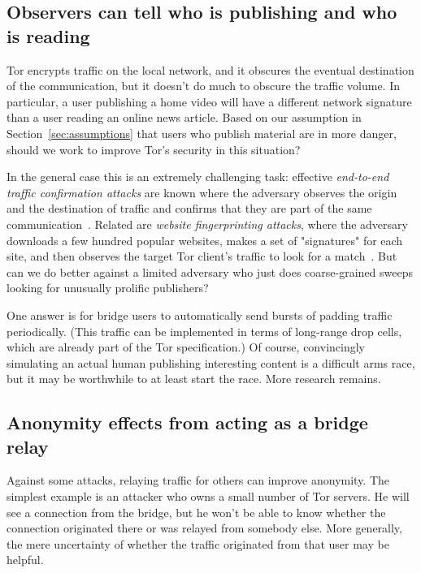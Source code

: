\documentclass{llncs}
\begin{document}

\subsection{Observers can tell who is publishing and who is reading}
\label{subsec:upload-padding}

Tor encrypts traffic on the local network, and it obscures the eventual
destination of the communication, but it doesn't do much to obscure the
traffic volume. In particular, a user publishing a home video will have a
different network signature than a user reading an online news article.
Based on our assumption in Section~\ref{sec:assumptions} that users who
publish material are in more danger, should we work to improve Tor's
security in this situation?

In the general case this is an extremely challenging task:
effective \emph{end-to-end traffic confirmation attacks}
are known where the adversary observes the origin and the
destination of traffic and confirms that they are part of the
same communication~\cite{danezis:pet2004,e2e-traffic}. Related are
\emph{website fingerprinting attacks}, where the adversary downloads
a few hundred popular websites, makes a set of "signatures" for each
site, and then observes the target Tor client's traffic to look for
a match~\cite{pet05-bissias,defensive-dropping}. But can we do better
against a limited adversary who just does coarse-grained sweeps looking
for unusually prolific publishers?

One answer is for bridge users to automatically send bursts of padding
traffic periodically. (This traffic can be implemented in terms of
long-range drop cells, which are already part of the Tor specification.)
Of course, convincingly simulating an actual human publishing interesting
content is a difficult arms race, but it may be worthwhile to at least
start the race. More research remains.

\subsection{Anonymity effects from acting as a bridge relay}

Against some attacks, relaying traffic for others can improve
anonymity. The simplest example is an attacker who owns a small number
of Tor servers. He will see a connection from the bridge, but he won't
be able to know whether the connection originated there or was relayed
from somebody else. More generally, the mere uncertainty of whether the
traffic originated from that user may be helpful.
\end{document}

